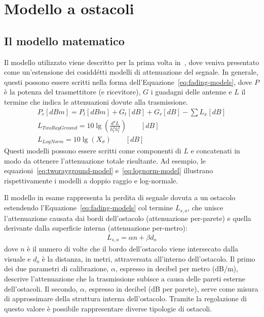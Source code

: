 

\chapter{Modello a ostacoli}\label{chap:modello-a-ostacoli}
%
\section{Il modello matematico}\label{sec:il-modello-matematico}
Il modello utilizzato viene descritto per la prima volta in~\cite{5720204}, dove veniva presentato
come un'estensione dei cosiddétti modelli di attenuazione del segnale.
In generale, questi possono essere scritti nella forma dell'Equazione~\ref{eq:fading-models}, dove $P$ è la potenza del trasmettitore (e ricevitore),
$G$ i guadagni delle antenne e $L$ il termine che indica le attenuazioni dovute alla trasmissione.
%
\begin{gather}
	P_r[dBm] = P_t[dBm] + G_t[dB] + G_r[dB] - \sum L_x[dB] 														\label{eq:fading-models} \\
	L_{TwoRayGround} = 10 \lg \left( \frac{d^4 L}{h^2_t h^2_t} \right)	\qquad [dB]		\label{eq:tworayground-model} \\
	L_{LogNorm} = 10 \lg \left( X_\sigma \right)	\qquad [dB]													\label{eq:lognorm-model}
\end{gather}
%
Questi modelli possono essere scritti come componenti di $L$ e concatenati in modo da ottenere l'attenuazione totale risultante.
Ad esempio, le equazioni~\ref{eq:tworayground-model} e~\ref{eq:lognorm-model} illustrano rispettivamente i modelli a doppio raggio e log-normale.

Il modello in esame rappresenta la perdita di segnale dovuta a un ostacolo estendendo l'Equazione~\ref{eq:fading-models}
col termine $L_{s,o}$, che unisce l'attenuazione causata dai bordi dell'ostacolo (attenuazione per-parete)
e quella derivante dalla superficie interna (attenuazione per-metro):
%
\begin{gather}\label{eq:osbtacle-model}
	L_{s,o} = \alpha n + \beta d_o
\end{gather}
dove $n$ è il numero di volte che il bordo dell'ostacolo viene intersecato dalla visuale e $d_o$ è la distanza, in metri, attraversata all'interno dell'ostacolo.
Il primo dei due parametri di calibrazione, $\alpha$, espresso in decibel per metro (dB/m), descrive l'attenuazione
che la trasmissione subisce a causa delle pareti esterne dell'ostacoli.
Il secondo, $\alpha$, espresso in decibel (dB per parete), serve come misura di approssimare della struttura interna dell'ostacolo.
Tramite la regolazione di questo valore è possibile rappresentare diverse tipologie di ostacoli.


